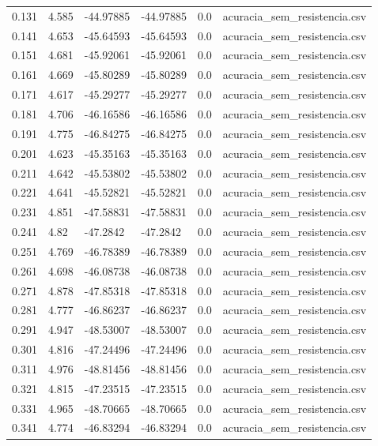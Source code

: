 \begin{table}
\begin{tabular}{llllll}
0.131 & 4.585 & -44.97885 & -44.97885 & 0.0 & acuracia\_sem\_resistencia.csv \\
0.141 & 4.653 & -45.64593 & -45.64593 & 0.0 & acuracia\_sem\_resistencia.csv \\
0.151 & 4.681 & -45.92061 & -45.92061 & 0.0 & acuracia\_sem\_resistencia.csv \\
0.161 & 4.669 & -45.80289 & -45.80289 & 0.0 & acuracia\_sem\_resistencia.csv \\
0.171 & 4.617 & -45.29277 & -45.29277 & 0.0 & acuracia\_sem\_resistencia.csv \\
0.181 & 4.706 & -46.16586 & -46.16586 & 0.0 & acuracia\_sem\_resistencia.csv \\
0.191 & 4.775 & -46.84275 & -46.84275 & 0.0 & acuracia\_sem\_resistencia.csv \\
0.201 & 4.623 & -45.35163 & -45.35163 & 0.0 & acuracia\_sem\_resistencia.csv \\
0.211 & 4.642 & -45.53802 & -45.53802 & 0.0 & acuracia\_sem\_resistencia.csv \\
0.221 & 4.641 & -45.52821 & -45.52821 & 0.0 & acuracia\_sem\_resistencia.csv \\
0.231 & 4.851 & -47.58831 & -47.58831 & 0.0 & acuracia\_sem\_resistencia.csv \\
0.241 & 4.82 & -47.2842 & -47.2842 & 0.0 & acuracia\_sem\_resistencia.csv \\
0.251 & 4.769 & -46.78389 & -46.78389 & 0.0 & acuracia\_sem\_resistencia.csv \\
0.261 & 4.698 & -46.08738 & -46.08738 & 0.0 & acuracia\_sem\_resistencia.csv \\
0.271 & 4.878 & -47.85318 & -47.85318 & 0.0 & acuracia\_sem\_resistencia.csv \\
0.281 & 4.777 & -46.86237 & -46.86237 & 0.0 & acuracia\_sem\_resistencia.csv \\
0.291 & 4.947 & -48.53007 & -48.53007 & 0.0 & acuracia\_sem\_resistencia.csv \\
0.301 & 4.816 & -47.24496 & -47.24496 & 0.0 & acuracia\_sem\_resistencia.csv \\
0.311 & 4.976 & -48.81456 & -48.81456 & 0.0 & acuracia\_sem\_resistencia.csv \\
0.321 & 4.815 & -47.23515 & -47.23515 & 0.0 & acuracia\_sem\_resistencia.csv \\
0.331 & 4.965 & -48.70665 & -48.70665 & 0.0 & acuracia\_sem\_resistencia.csv \\
0.341 & 4.774 & -46.83294 & -46.83294 & 0.0 & acuracia\_sem\_resistencia.csv \\

\end{tabular}
\end{table}

